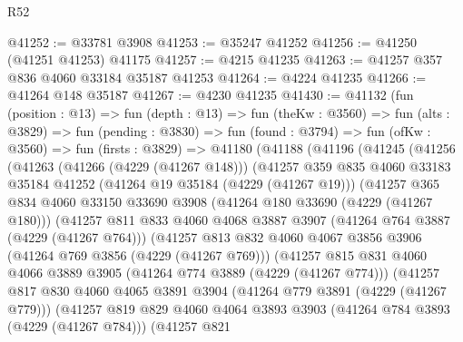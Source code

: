 \begin{lexlean}{R52}
\begin{coremodule}
@41252 := @33781 @3908
@41253 := @35247 @41252
@41256 := @41250 (@41251 @41253) @41175
@41257 := @4215 @41235
@41263 := @41257 @357 @836 @4060 @33184 @35187 @41253
@41264 := @4224 @41235
@41266 := @41264 @148 @35187
@41267 := @4230 @41235
@41430 := @41132
    (fun (position : @13) =>
    fun (depth : @13) =>
    fun (theKw : @3560) =>
    fun (alts : @3829) =>
    fun (pending : @3830) =>
    fun (found : @3794) =>
    fun (ofKw : @3560) =>
    fun (firsts : @3829) =>
    @41180
      (@41188
        (@41196
          (@41245
            (@41256
              (@41263
                (@41266 (@4229 (@41267 @148)))
                (@41257
                  @359
                  @835
                  @4060
                  @33183
                  @35184
                  @41252
                  (@41264 @19 @35184 (@4229 (@41267 @19)))
                  (@41257
                    @365
                    @834
                    @4060
                    @33150
                    @33690
                    @3908
                    (@41264 @180 @33690 (@4229 (@41267 @180)))
                    (@41257
                      @811
                      @833
                      @4060
                      @4068
                      @3887
                      @3907
                      (@41264 @764 @3887 (@4229 (@41267 @764)))
                      (@41257
                        @813
                        @832
                        @4060
                        @4067
                        @3856
                        @3906
                        (@41264 @769 @3856 (@4229 (@41267 @769)))
                        (@41257
                          @815
                          @831
                          @4060
                          @4066
                          @3889
                          @3905
                          (@41264 @774 @3889 (@4229 (@41267 @774)))
                          (@41257
                            @817
                            @830
                            @4060
                            @4065
                            @3891
                            @3904
                            (@41264 @779 @3891 (@4229 (@41267 @779)))
                            (@41257
                              @819
                              @829
                              @4060
                              @4064
                              @3893
                              @3903
                              (@41264 @784 @3893 (@4229 (@41267 @784)))
                              (@41257
                                @821

\end{coremodule}
\end{lexlean}
